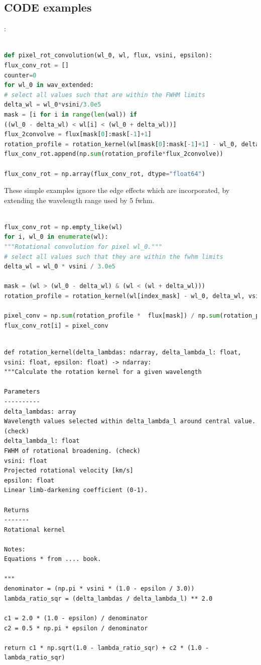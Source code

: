 \subsection{CODE examples}:

\begin{lstlisting}[language=Python, caption=Python example old]

def pixel_rot_convolution(wl_0, wl, flux, vsini, epsilon):
flux_conv_rot = []
counter=0
for wl_0 in wav_extended:
# select all values such that are within the FWHM limits
delta_wl = wl_0*vsini/3.0e5
mask = [i for i in range(len(wal)) if
((wl_0 - delta_wl) < wl[i] < (wl_0 + delta_wl))]
flux_2convolve = flux[mask[0]:mask[-1]+1]
rotation_profile = rotation_kernel(wl[mask[0]:mask[-1]+1] - wl_0, delta_wl, vsini, epsilon)
flux_conv_rot.append(np.sum(rotation_profile*flux_2convolve))

flux_conv_rot = np.array(flux_conv_rot, dtype="float64")

\end{lstlisting}

These simple examples ignore the edge effects which are incorporated, by extending the wavelength range used by 5 fwhm.
\begin{lstlisting}[language=Python, caption=Python example]

flux_conv_rot = np.empty_like(wl)
for i, wl_0 in enumerate(wl):
"""Rotational convolution for pixel wl_0."""
# select all values such that they are within the fwhm limits
delta_wl = wl_0 * vsini / 3.0e5

mask = (wl > (wl_0 - delta_wl) & (wl < (wl + delta_wl)))
rotation_profile = rotation_kernel(wl[index_mask] - wl_0, delta_wl, vsini, epsilon)

pixel_conv = np.sum(rotation_profile *  flux[mask]) / np.sum(rotation_profile)
flux_conv_rot[i] = pixel_conv

\end{lstlisting}


\begin{lstlisting}

def rotation_kernel(delta_lambdas: ndarray, delta_lambda_l: float, vsini: float, epsilon: float) -> ndarray:
"""Calculate the rotation kernel for a given wavelength

Parameters
----------
delta_lambdas: array
Wavelength values selected within delta_lambda_l around central value. (check)
delta_lambda_l: float
FWHM of rotational broadening. (check)
vsini: float
Projected rotational velocity [km/s]
epsilon: float
Linear limb-darkening coefficient (0-1).

Returns
-------
Rotational kernel

Notes:
Equations * from .... book.

"""
denominator = (np.pi * vsini * (1.0 - epsilon / 3.0))
lambda_ratio_sqr = (delta_lambdas / delta_lambda_l) ** 2.0

c1 = 2.0 * (1.0 - epsilon) / denominator
c2 = 0.5 * np.pi * epsilon / denominator

return c1 * np.sqrt(1.0 - lambda_ratio_sqr) + c2 * (1.0 - lambda_ratio_sqr)
\end{lstlisting}
